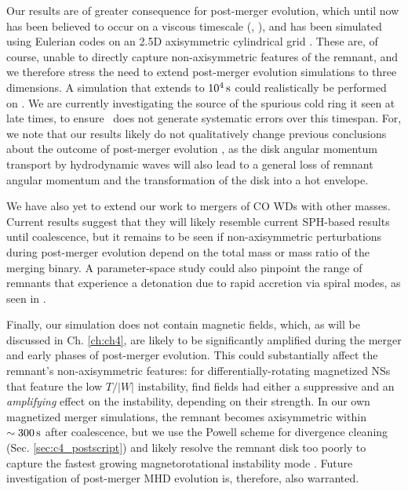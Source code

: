 Our results are of greater consequence for post-merger evolution, which until now has been believed to occur on a viscous timescale (\citeal{vkercj10}, \citealt{shen+12}), and has been simulated using Eulerian codes on an 2.5D  axisymmetric cylindrical grid \citep{schw+12,ji+13}.  These are, of course, unable to directly capture non-axisymmetric features of the remnant, and we therefore stress the need to extend post-merger evolution simulations to three dimensions.  A simulation that extends to $10^4\,\mathrm{s}$ could realistically be performed on \arepo.  We are currently investigating the source of the spurious cold ring it seen at late times, to ensure \arepo\ does not generate systematic errors over this timespan.  For, we note that our results likely do not qualitatively change previous conclusions about the outcome of post-merger evolution \citep{schw+12,ji+13}, as the disk angular momentum transport by hydrodynamic waves will also lead to a general loss of remnant angular momentum and the transformation of the disk into a hot envelope.

We have also yet to extend our work to mergers of CO WDs with other masses.  Current results suggest that they will likely resemble current SPH-based results until coalescence, but it remains to be seen if non-axisymmetric perturbations during post-merger evolution depend on the total mass or mass ratio of the merging binary.  A parameter-space study could also pinpoint the range of remnants that experience a detonation due to rapid accretion via spiral modes, as seen in \cite{kash+15}.

Finally, our simulation does not contain magnetic fields, which, as will be discussed in Ch. \ref{ch:ch4}, are likely to be significantly amplified during the merger and early phases of post-merger evolution.  This could substantially affect the remnant's non-axisymmetric features: for differentially-rotating magnetized NSs that feature the low $T/|W|$ instability, \cite{muhl+14} find fields had either a suppressive and an \textit{amplifying} effect on the instability, depending on their strength.  In our own magnetized merger simulations, the remnant becomes axisymmetric within $\sim300\,\mathrm{s}$ after coalescence, but we use the Powell scheme for divergence cleaning (Sec. \ref{sec:c4_postscript}) and likely resolve the remnant disk too poorly to capture the fastest growing magnetorotational instability mode \citep{ji+13}.  Future investigation of post-merger MHD evolution is, therefore, also warranted.

\vspace{5mm}

